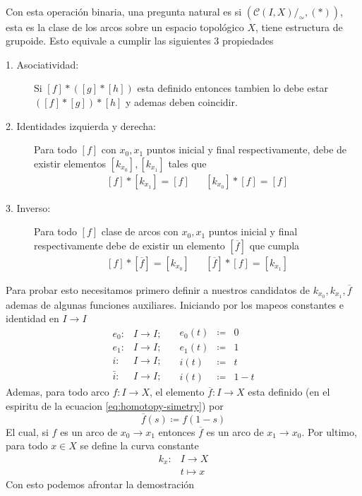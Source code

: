 \paragraph{} Con esta operación binaria, una pregunta natural es si
\((\mathcal C (I , X)/_\simeq , (*))\), esta es la clase de los arcos
sobre un espacio topológico \(X\), tiene estructura de grupoide. Esto
equivale a cumplir las siguientes 3 propiedades
\begin{description}
\item[1. Asociatividad:] Si \([f] * ([g] * [h])\) esta definido entonces
  tambien lo debe estar \(([f] * [g]) * [h]\) y ademas deben coincidir.
\item[2. Identidades izquierda y derecha:] Para todo \([f]\) con
  \(x_0, x_1\) puntos inicial y final respectivamente, debe de
existir elementos \([k_{x_0}], [k_{x_1}]\) tales que
\[ \begin{matrix}
    [f] * [k_{x_1}] = [f] & & [k_{x_0}] * [f] = [f]
  \end{matrix}
\]
\item[3. Inverso:] Para todo \([f]\) clase de arcos con \(x_0, x_1\)
  puntos inicial y final respectivamente debe de existir un elemento
  \([\overline f]\) que cumpla
\[ \begin{matrix}
    [f] * [\overline{f}] = [k_{x_0}] & & [\overline{f}] * [f] = [k_{x_1}]
  \end{matrix}
\]
\end{description}
Para probar esto necesitamos primero definir a nuestros candidatos de
\(k_{x_0}, k_{x_1}, \overline{f}\) ademas de algunas funciones auxiliares.
Iniciando por los mapeos constantes e identidad en \(I \to I\)
\begin{equation} \label{eq:def-auxiliar-grupoide}
  \begin{matrix}
     e_0 :     & I \to I; \\
     e_1 :     & I \to I; \\
     i :       & I \to I; \\
     \bar{i} : & I \to I;
   \end{matrix}
   \quad
   \begin{matrix}
      e_0(t) &\coloneqq &0 \\
      e_1(t) &\coloneqq &1 \\
      i(t)   &\coloneqq &t   \\
      i(t)   &\coloneqq &1 - t
   \end{matrix}
\end{equation}
Ademas, para todo arco \(f : I \to X \), el elemento \(\overline{f} : I
\to X \) esta definido (en el espiritu de la ecuacion
\eqref{eq:homotopy-simetry}) por
\[ \overline{f} (s) \coloneqq f (1 - s) \]
El cual, si \(f\) es un arco de \(x_0 \to x_1\) entonces \(\overline{f}\) es
un arco de \(x_1 \to x_0\). Por ultimo, para todo \(x \in X \) se define
la curva constante
\begin{align*}
  k_x : &I \longrightarrow X \\
        &t \longmapsto x
\end{align*}
Con esto podemos afrontar la demostración

